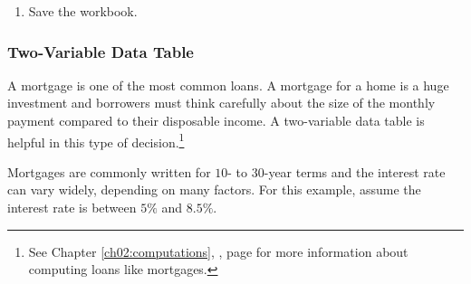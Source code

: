 \begin{enumerate}[resume]
	\item Save the  workbook.
\end{enumerate}

\subsubsection{Two-Variable Data Table}

A mortgage is one of the most common loans. A mortgage for a home is a huge investment and borrowers must think carefully about the size of the monthly payment compared to their disposable income. A two-variable data table is helpful in this type of decision.\footnote{See Chapter \ref{ch02:computations}, , page \pageref{ch02:computations} for more information about computing loans like mortgages.}

Mortgages are commonly written for $ 10 $- to $ 30 $-year terms and the interest rate can vary widely, depending on many factors. For this example, assume the interest rate is between $ 5\% $ and $ 8.5\% $.

